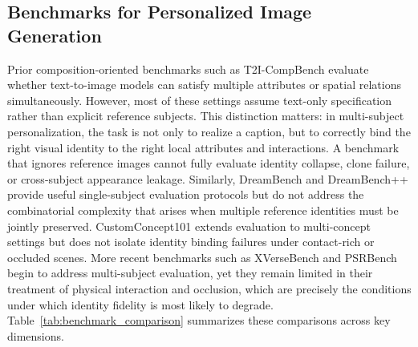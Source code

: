 \documentclass{article}
\begin{document}
\subsection{Benchmarks for Personalized Image Generation}
Prior composition-oriented benchmarks such as T2I-CompBench \cite{huang2023t2i} evaluate whether text-to-image models can satisfy multiple attributes or spatial relations simultaneously.
However, most of these settings assume text-only specification rather than explicit reference subjects. This distinction matters: in multi-subject personalization, the task is not only to realize a caption, but to correctly bind the right visual identity to the right local attributes and interactions. A benchmark that ignores reference images cannot fully evaluate identity collapse, clone failure, or cross-subject appearance leakage. Similarly, DreamBench \cite{ruiz2023dreambooth} and DreamBench++ \cite{peng2024dreambench} provide useful single-subject evaluation protocols but do not address the combinatorial complexity that arises when multiple reference identities must be jointly preserved. CustomConcept101 \cite{kumari2023multi} extends evaluation to multi-concept settings but does not isolate identity binding failures under contact-rich or occluded scenes. More recent benchmarks such as XVerseBench \cite{chen2025xverse} and PSRBench \cite{wang2025psr} begin to address multi-subject evaluation, yet they remain limited in their treatment of physical interaction and occlusion, which are precisely the conditions under which identity fidelity is most likely to degrade. Table~\ref{tab:benchmark_comparison} summarizes these comparisons across key dimensions.
\end{document}
